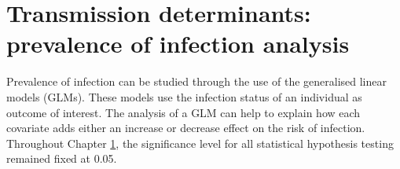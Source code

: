 \chapter[Transmission determinants: prevalence of infection analysis]{Transmission determinants:\\prevalence of infection analysis}
\label{ch:4.0}

Prevalence of infection can be studied through the use of the generalised linear models (GLMs).
These models use the infection status of an individual as outcome of interest.
The analysis of a GLM can help to explain how each covariate adds either an increase or decrease effect on the risk of infection.
Throughout Chapter \ref{ch:4.0}, the significance level for all statistical hypothesis testing remained fixed at 0.05.



